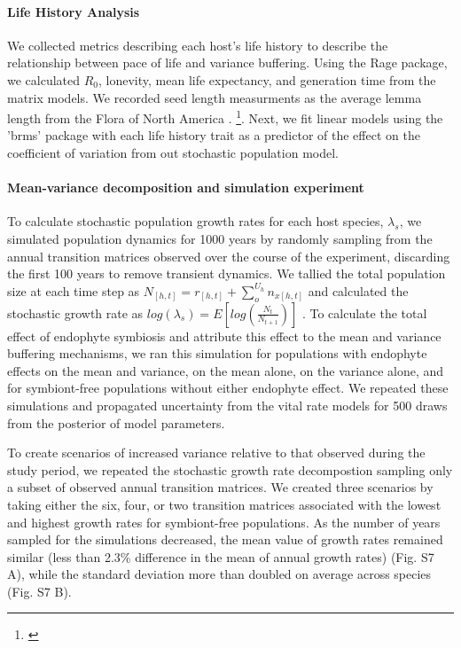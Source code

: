 \documentclass[12pt]{article}
\newcommand{\josh}[2]{{\color{blue}{#1}}\footnote{\textit{\color{blue}{#2}}}}
\begin{document}
\paragraph*{Life History Analysis}
We collected metrics describing each host's life history to describe the relationship between pace of life and variance buffering. Using the Rage package, we calculated $R_0$, lonevity, mean life expectancy, and generation time from the matrix models. We recorded seed length measurments as the average lemma length from the Flora of North America \cite{}. \josh{Data on the rates of imperfect transmission come from XXX}{I don't know where these data are from}. Next, we fit linear models using the 'brms' package \cite{} with each life history trait as a predictor of the effect on the coefficient of variation from out stochastic population model. 

\paragraph*{Mean-variance decomposition and simulation experiment}
To calculate stochastic population growth rates for each host species, $\lambda_s$, we simulated population dynamics for 1000 years by randomly sampling from the annual transition matrices observed over the course of the experiment, discarding the first 100 years to remove transient dynamics. 
We tallied the total population size at each time step as  $N_{[h,t]} = r_{[h,t]} + \sum_{o}^{U_h}n_{x[h,t]}$ and calculated the stochastic growth rate as $log(\lambda_s) = E[log(\frac{N_{t}}{N_{t+1}})]$ \cite{caswell2001matrix,rees2009integral}.
To calculate the total effect of endophyte symbiosis and attribute this effect to the mean and variance buffering mechanisms, we ran this simulation for populations with endophyte effects on the mean and variance, on the mean alone, on the variance alone, and for symbiont-free populations without either endophyte effect. 
We repeated these simulations and propagated uncertainty from the vital rate models for 500 draws from the posterior of model parameters. 

To create scenarios of increased variance relative to that observed during the study period, we repeated the stochastic growth rate decompostion sampling only a subset of observed annual transition matrices. 
We created three scenarios by taking either the six, four, or two transition matrices associated with the lowest and highest growth rates for symbiont-free populations. 
As the number of years sampled for the simulations decreased, the mean value of growth rates remained similar (less than 2.3\% difference in the mean of annual growth rates) (Fig. S7 A), while the standard deviation more than doubled on average across species (Fig. S7 B).  
\end{document}
